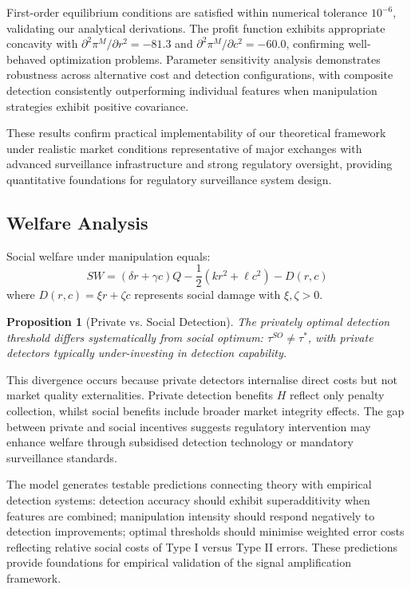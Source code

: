 \documentclass[12pt]{article}
\newtheorem{proposition}[theorem]{Proposition}
\begin{document}
First-order equilibrium conditions are satisfied within numerical tolerance $10^{-6}$, validating our analytical derivations. The profit function exhibits appropriate concavity with $\partial^2\pi^M/\partial r^2 = -81.3$ and $\partial^2\pi^M/\partial c^2 = -60.0$, confirming well-behaved optimization problems. Parameter sensitivity analysis demonstrates robustness across alternative cost and detection configurations, with composite detection consistently outperforming individual features when manipulation strategies exhibit positive covariance.

These results confirm practical implementability of our theoretical framework under realistic market conditions representative of major exchanges with advanced surveillance infrastructure and strong regulatory oversight, providing quantitative foundations for regulatory surveillance system design.

\subsection{Welfare Analysis}

Social welfare under manipulation equals:
\begin{equation}
SW = (\delta r + \gamma c)Q - \frac{1}{2}(kr^2 + \ell c^2) - D(r,c)
\end{equation}
where $D(r,c) = \xi r + \zeta c$ represents social damage with $\xi, \zeta > 0$.

\begin{proposition}[Private vs. Social Detection]
The privately optimal detection threshold differs systematically from social optimum: $\tau^{SO} \neq \tau^*$, with private detectors typically under-investing in detection capability.
\end{proposition}

This divergence occurs because private detectors internalise direct costs but not market quality externalities. Private detection benefits $H$ reflect only penalty collection, whilst social benefits include broader market integrity effects. The gap between private and social incentives suggests regulatory intervention may enhance welfare through subsidised detection technology or mandatory surveillance standards.

The model generates testable predictions connecting theory with empirical detection systems: detection accuracy should exhibit superadditivity when features are combined; manipulation intensity should respond negatively to detection improvements; optimal thresholds should minimise weighted error costs reflecting relative social costs of Type I versus Type II errors. These predictions provide foundations for empirical validation of the signal amplification framework.
\end{document}
